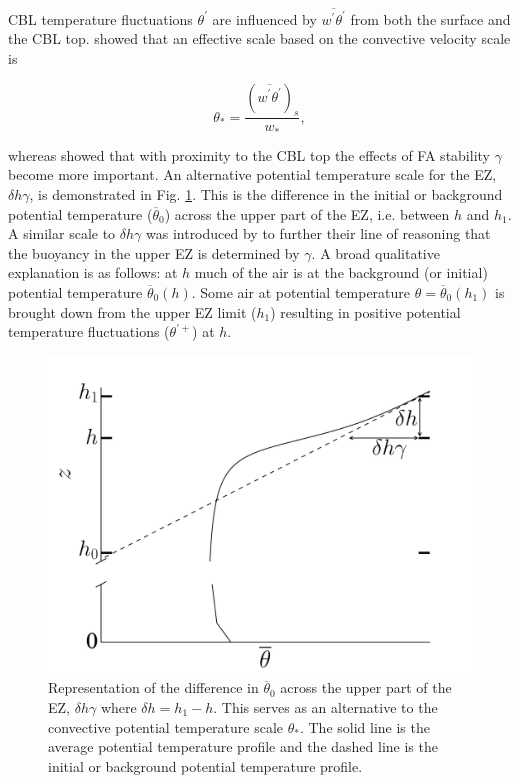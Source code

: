 \documentclass[referee]{svjour3}
\begin{document}
CBL temperature fluctuations $\theta^{'}$ are influenced by $\overline{w^{'}\theta^{'}}$ from both the surface and the CBL top.  \cite{Deardorff70} showed that an effective scale based on the convective velocity scale is

\begin{equation}
\theta_{*} = \frac{(\overline{w^{'}\theta^{'}})_{s}}{w_{*}},
\end{equation} 

whereas \cite{Sorbjan1} showed that with proximity to the CBL top the effects of FA stability $\gamma$ become more important.  An alternative potential temperature scale for the EZ, $\delta h \gamma$, is demonstrated in Fig. \ref{fig:deltahgamma}. This is the difference in the initial or background potential temperature ($\overline{\theta}_{0}$) across the upper part of the EZ, i.e. between $h$ and $h_{1}$.\\      

A similar scale to $\delta h \gamma$ was introduced by \cite{GarciaMellado} to further their line of reasoning that the buoyancy in the upper EZ is determined by $\gamma$. A broad qualitative explanation is as follows: at $h$ much of the air is at the background (or initial) potential temperature $\overline{\theta}_{0}(h)$.  Some air at potential temperature $\theta = \overline{\theta}_{0}(h_{1})$ is brought down from the upper EZ limit ($h_{1}$) resulting in positive potential temperature fluctuations ($\theta^{'+}$) at $h$.\\

\begin{figure}[htbp]
    \centering
    \includegraphics[scale=.32]{figures/deltah_gamma.pdf}
    \caption[Alternative Potential Temperature Scale for the EZ]{Representation of the difference in $\overline{\theta}_{0}$ across the upper part of the EZ, $\delta h \gamma$ where $\delta h = h_{1} - h$. This serves as an alternative to the convective potential temperature scale $\theta_{*}$.  The solid line is the average potential temperature profile and the dashed line is the initial or background potential temperature profile.}
    \label{fig:deltahgamma}   %
\end{figure}
\end{document}
